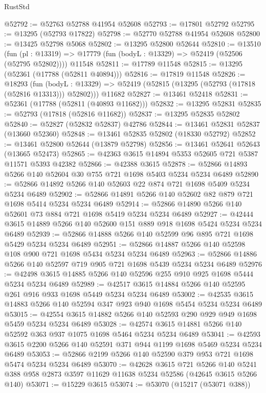 \begin{lexlean}{RustStd}
\begin{coremodule}
@52792 := @52763 @52788 @41954 @52608
@52793 := @17801 @52792
@52795 := @13295 (@52793 @17822)
@52798 := @52770 @52788 @41954 @52608
@52800 := @13425 @52798 @5068
@52802 := @13295 @52800 @52644
@52810 := @13510
    (fun (pl : @13319) => @17779 (fun (bodyL : @13329) => @52419 (@52506 (@52795 @52802))))
    @11548
@52811 := @17789 @11548
@52815 := @13295 (@52361 (@17788 (@52811 @40894)))
@52816 := @17819 @11548
@52826 := @18293
    (fun (bodyL : @13329) => @52419 (@52815 (@13295 (@52793 (@17818 (@52816 @13313))) @52802)))
    @11682
@52827 := @13461 @52418
@52831 := @52361 (@17788 (@52811 (@40893 @11682)))
@52832 := @13295 @52831
@52835 := @52793 (@17818 (@52816 @11682))
@52837 := @13295 @52835 @52802
@52840 := @52827 (@52832 @52837) @42786
@52844 := @13461 @52831 @52837 (@13660 @52360)
@52848 := @13461 @52835 @52802 (@18330 @52792)
@52852 := @13461 @52800 @52644 (@13879 @52798)
@52856 := @13461 @52641 @52643 (@13665 @52473)
@52865 := @42363 @3615 @14894 @5353 @52605 @721 @5387 @11571 @5393 @42382
@52866 := @42388 @3615
@52878 := @52866 @14893 @5266 @140 @52604 @30 @755 @721 @1698 @5403 @5234 @5234 @6489
@52890 := @52866 @14892 @5266 @140 @52603 @22 @874 @721 @1698 @5409 @5234 @5234 @6489
@52902 := @52866 @14891 @5266 @140 @52602 @82 @879 @721 @1698 @5414 @5234 @5234 @6489
@52914 := @52866 @14890 @5266 @140 @52601 @73 @884 @721 @1698 @5419 @5234 @5234 @6489
@52927 := @42444 @3615 @14889 @5266 @140 @52600 @151 @889 @918 @1698 @5424 @5234 @5234 @6489
@52939 := @52866 @14888 @5266 @140 @52599 @96 @895 @721 @1698 @5429 @5234 @5234 @6489
@52951 := @52866 @14887 @5266 @140 @52598 @108 @900 @721 @1698 @5434 @5234 @5234 @6489
@52963 := @52866 @14886 @5266 @140 @52597 @719 @905 @721 @1698 @5439 @5234 @5234 @6489
@52976 := @42498 @3615 @14885 @5266 @140 @52596 @255 @910 @925 @1698 @5444 @5234 @5234 @6489
@52989 := @42517 @3615 @14884 @5266 @140 @52595 @261 @916 @933 @1698 @5449 @5234 @5234 @6489
@53002 := @42535 @3615 @14883 @5266 @140 @52594 @347 @923 @940 @1698 @5454 @5234 @5234 @6489
@53015 := @42554 @3615 @14882 @5266 @140 @52593 @290 @929 @949 @1698 @5459 @5234 @5234 @6489
@53028 := @42574 @3615 @14881 @5266 @140 @52592 @363 @937 @1075 @1698 @5464 @5234 @5234 @6489
@53041 := @42593 @3615 @2200 @5266 @140 @52591 @371 @944 @1199 @1698 @5469 @5234 @5234 @6489
@53053 := @52866 @2199 @5266 @140 @52590 @379 @953 @721 @1698 @5474 @5234 @5234 @6489
@53070 := @42628
    @3615
    @721
    @5266
    @140
    @5241
    @388
    @958
    @2873
    @3597
    @11629
    @11638
    @5234
    @52586
    (@42645 @3615 @5266 @140)
@53071 := @15229 @3615
@53074 := @53070 (@15217 (@53071 @388))

\end{coremodule}
\end{lexlean}
